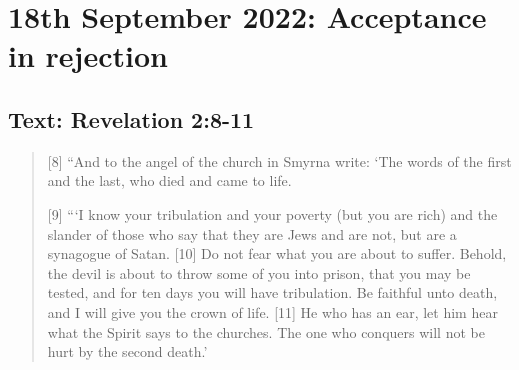 \section{18th September 2022: Acceptance in rejection}
\subsection*{Text: Revelation 2:8-11}
  \begin{quote}
    [8] “And to the angel of the church in Smyrna write: ‘The words of the
    first and the last, who died and came to life.

    [9] “‘I know your tribulation and your poverty (but you are rich) and the
    slander of those who say that they are Jews and are not, but are a
    synagogue of Satan.  [10] Do not fear what you are about to suffer.
    Behold, the devil is about to throw some of you into prison, that you may
    be tested, and for ten days you will have tribulation.  Be faithful unto
    death, and I will give you the crown of life.  [11] He who has an ear,
    let him hear what the Spirit says to the churches.  The one who conquers
    will not be hurt by the second death.’
  \end{quote}
